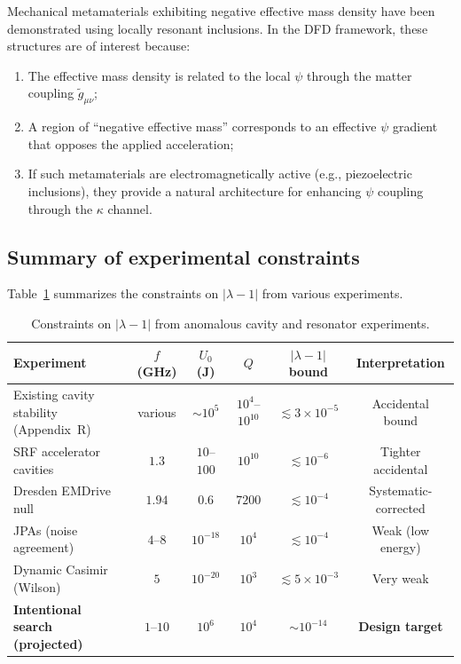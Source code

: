 \documentclass[12pt,aps,prd,twocolumn,superscriptaddress,nofootinbib]{revtex4-2}
\begin{document}
Mechanical metamaterials exhibiting negative effective mass density
have been demonstrated using locally resonant inclusions.  In the
DFD framework, these structures are of interest because:
\begin{enumerate}[noitemsep]
  \item The effective mass density is related to the local $\psi$
    through the matter coupling $\tilde{g}_{\mu\nu}$;
  \item A region of ``negative effective mass'' corresponds to an
    effective $\psi$ gradient that opposes the applied acceleration;
  \item If such metamaterials are electromagnetically active (e.g.,
    piezoelectric inclusions), they provide a natural architecture
    for enhancing $\psi$ coupling through the $\kappa$ channel.
\end{enumerate}

\subsection{Summary of experimental constraints}

Table~\ref{tab:constraints} summarizes the constraints on
$|\lambda - 1|$ from various experiments.

\begin{table}
\caption{Constraints on $|\lambda - 1|$ from anomalous cavity and
resonator experiments.}
\label{tab:constraints}
\begin{ruledtabular}
\begin{tabular}{lccccc}
Experiment & $f$ (GHz) & $U_0$ (J) & $Q$ &
  $|\lambda-1|$ bound & Interpretation \\
\hline
Existing cavity stability (Appendix~R) & various & $\sim 10^5$ &
  $10^4$--$10^{10}$ & $\lesssim 3\times 10^{-5}$ & Accidental bound \\
SRF accelerator cavities & $1.3$ & $10$--$100$ & $10^{10}$ &
  $\lesssim 10^{-6}$ & Tighter accidental \\
Dresden EMDrive null & $1.94$ & $0.6$ & $7200$ &
  $\lesssim 10^{-4}$ & Systematic-corrected \\
JPAs (noise agreement) & $4$--$8$ & $10^{-18}$ & $10^4$ &
  $\lesssim 10^{-4}$ & Weak (low energy) \\
Dynamic Casimir (Wilson) & $5$ & $10^{-20}$ & $10^3$ &
  $\lesssim 5\times 10^{-3}$ & Very weak \\
\hline
\textbf{Intentional search (projected)} & $1$--$10$ & $10^6$ &
  $10^4$ & $\sim 10^{-14}$ & \textbf{Design target} \\
\end{tabular}
\end{ruledtabular}
\end{table}
\end{document}
